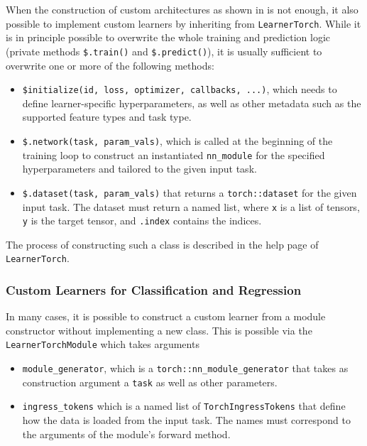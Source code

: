 \documentclass[article, nojss]{jss}
\theoremstyle{definition}
\begin{document}
When the construction of custom architectures as shown in  is not enough, it also possible to implement custom learners by inheriting from \texttt{LearnerTorch}.
While it is in principle possible to overwrite the whole training and prediction logic (private methods \texttt{\$.train()} and \texttt{\$.predict()}), it is usually sufficient to overwrite one or more of the following methods:
\begin{itemize}
    \item \texttt{\$initialize(id, loss, optimizer, callbacks, ...)}, which needs to define learner-specific hyperparameters, as well as other metadata such as the supported feature types and task type.
    \item \texttt{\$.network(task, param\_vals)}, which is called at the beginning of the training loop to construct an instantiated \texttt{nn\_module} for the specified hyperparameters and tailored to the given input task.
    \item \texttt{\$.dataset(task, param\_vals)} that returns a \texttt{torch::dataset} for the given input task. The dataset must return a named list, where \texttt{x} is a list of tensors, \texttt{y} is the target tensor, and \texttt{.index} contains the indices.
\end{itemize}

The process of constructing such a class is described in the help page of \texttt{LearnerTorch}.

\subsubsection{Custom Learners for Classification and Regression}

In many cases, it is possible to construct a custom learner from a module constructor without implementing a new class.
This is possible via the \texttt{LearnerTorchModule} which takes arguments
\begin{itemize}
    \item \texttt{module\_generator}, which is a \texttt{torch::nn\_module\_generator} that takes as construction argument a \texttt{task} as well as other parameters.
    \item \texttt{ingress\_tokens} which is a named list of \texttt{TorchIngressTokens} that define how the data is loaded from the input task. The names must correspond to the arguments of the module's forward method.
\end{itemize}
\end{document}
